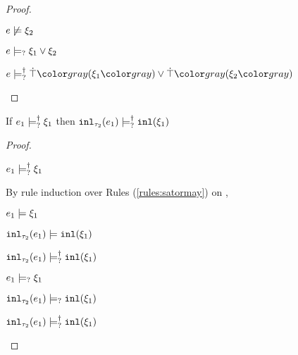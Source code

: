 \begin{proof}
\begin{byCases}
\begin{byCases}
  \item[\text{$\csatisfy{e}{\xi_2}$ is not derivable}]
    \begin{pfsteps*}
    \item $e \not\models \xi_2$  
    \item $e \models_{?} \xi_1 \vee \xi_2$  
    \item $\csatisfyormay{e}{\cor{\ctruify{\xi_1}}{\ctruify{\xi_2}}}$ 
    \end{pfsteps*}
  \end{byCases}

\end{byCases}
\resetpfcounter
\end{proof}

\begin{lem}
  \label{lem:satormay-inl}
  If $e_1 \models_{?}^{\dag} \xi_1$ then $\mathtt{inl}_{\tau_2}({e_1}) \models_{?}^{\dag} \mathtt{inl}(\xi_1)$
\end{lem}
\begin{proof}
  \begin{pfsteps*}
  \item $e_1 \models_{?}^{\dag} \xi_1$  
  \end{pfsteps*}
  By rule induction over Rules (\ref{rules:satormay}) on ,
  \begin{byCases}
  \item[\text{(\ref{rule:CSMSSat})}]
    \begin{pfsteps*}
    \item $e_1 \models \xi_1$  
    \item $\mathtt{inl}_{\tau_2}({e_1}) \models \mathtt{inl}(\xi_1)$  
    \item $\mathtt{inl}_{\tau_2}({e_1}) \models_{?}^{\dag} \mathtt{inl}(\xi_1)$ 
    \end{pfsteps*}

  \item[\text{(\ref{rule:CSMSMay})}]
    \begin{pfsteps*}
    \item $e_1 \models_{?} \xi_1$  
    \item $\mathtt{inl}_{\tau_2}({e_1}) \models_{?} \mathtt{inl}(\xi_1)$  
    \item $\mathtt{inl}_{\tau_2}({e_1}) \models_{?}^{\dag} \mathtt{inl}(\xi_1)$ 
    \end{pfsteps*}
  \end{byCases}
  \resetpfcounter
\end{proof}

